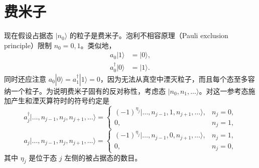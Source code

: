 \section{费米子}

现在假设占据态 $|n_0\rangle$ 的粒子是费米子。泡利不相容原理（Pauli exclusion principle）限制 $n_0=0,1$。类似地，
\begin{align*}
a_0|1\rangle &= |0\rangle, \\
a_0^\dagger|0\rangle &= |1\rangle.
\tag{4.13}
\end{align*}
同时还应注意 $a_0|0\rangle=a_1^\dagger|1\rangle=0$，因为无法从真空中湮灭粒子，而且每个态至多容纳一个粒子。为说明费米子固有的反对称性，考虑态 $|n_0,n_1,\ldots\rangle$。对这一参考态施加产生和湮灭算符时的符号约定是
\begin{equation*}
a_j^\dagger|\ldots,n_{j-1},n_j,n_{j+1},\ldots\rangle=
\begin{cases}
(-1)^{\eta_j}|\ldots,n_{j-1},1,n_{j+1},\ldots\rangle, & n_j=0, \\
0, & n_j=1,
\end{cases}
\tag{4.14}
\end{equation*}
\begin{equation*}
a_j|\ldots,n_{j-1},n_j,n_{j+1},\ldots\rangle=
\begin{cases}
(-1)^{\eta_j}|\ldots,n_{j-1},0,n_{j+1},\ldots\rangle, & n_j=1, \\
0, & n_j=0,
\end{cases}
\tag{4.15}
\end{equation*}
其中 $\eta_j$ 是位于态 $j$ 左侧的被占据态的数目。

